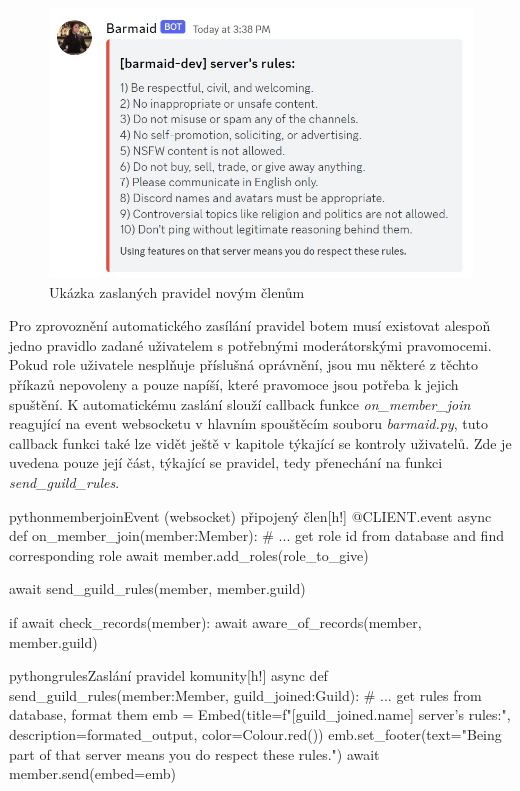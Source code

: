 \documentclass[
  program=inf,
biblatex=false,
sourcecodes=true,
joinlists=true,
  figures=true,
  tables=true,
  glossaries=true,
  index=false
]{kidiplom}
\begin{document}
\begin{figure}[h!]
  \centering \includegraphics[scale=0.9]{barmaid_rules2}
  \caption{\label{barmaid_rules}Ukázka zaslaných pravidel novým členům}
\end{figure}

Pro zprovoznění automatického zasílání pravidel botem musí existovat
alespoň jedno pravidlo zadané uživatelem s potřebnými moderátorskými pravomocemi. Pokud role uživatele nesplňuje
příslušná oprávnění, jsou mu některé z těchto příkazů nepovoleny a pouze napíší, které pravomoce jsou potřeba
k jejich spuštění. K automatickému zaslání slouží callback funkce {\it on\_member\_join} reagující na event
websocketu v hlavním spouštěcím souboru {\it barmaid.py}, tuto callback funkci také lze vidět ještě v kapitole
týkající se kontroly uživatelů. Zde je uvedena pouze její část, týkající se pravidel, tedy přenechání na funkci {\it send\_guild\_rules}.

\begin{kicode}{python}{memberjoin}{Event (websocket) připojený člen}[h!]
  @CLIENT.event
  async def on_member_join(member:Member):
      # ... get role id from database and find corresponding role
      await member.add_roles(role_to_give)
      
      await send_guild_rules(member, member.guild)

      if await check_records(member):
          await aware_of_records(member, member.guild)
\end{kicode}

\begin{kicode}{python}{grules}{Zaslání pravidel komunity}[h!]
  async def send_guild_rules(member:Member, guild_joined:Guild):
      # ... get rules from database, format them
      emb = Embed(title=f"[{guild_joined.name}] server's rules:",
                  description=formated_output,
                  color=Colour.red())
      emb.set_footer(text="Being part of that server means you do respect these rules.")
      await member.send(embed=emb)
\end{kicode}
\end{document}
